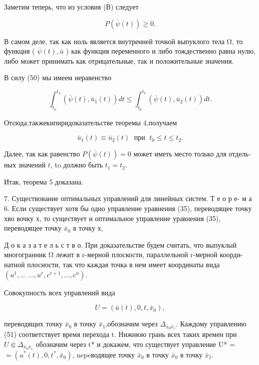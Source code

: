 \documentclass[10pt]{article}
\begin{document}
Заметим теперь, что из условия (В) следует

\[
P\left( {\overline{\psi }\left( t\right) }\right)  \geq  0. \tag{50}
\]

В самом деле, так как ноль является внутренней точкой выпуклого тела Ω, то функция ( \(\overline{\psi }\left( t\right),\bar{u}\) ) как функция переменного и либо тождественно равна нулю, либо может принимать как отрицательные, так и положительные значения.

В силу (50) мы имеем неравенство

\[
{\int }_{{t}_{0}}^{{t}_{2}}\left( {\overline{\psi }\left( t\right),{\bar{u}}_{1}\left( t\right) }\right) {dt} \leq  {\int }_{{t}_{0}}^{{t}_{2}}\left( {\overline{\psi }\left( t\right),{\bar{u}}_{2}\left( t\right) }\right) {dt}.
\]

Отсюда,такжекипиридоказательстве теоремы 4,получаем

\[
{\bar{u}}_{1}\left( t\right)  \equiv  {\bar{u}}_{2}\left( t\right) \;\text{ при }\;{t}_{0} \leq  t \leq  {t}_{2}.
\]

Далее, так как равенство \(P\left( {\overline{\psi }\left( t\right) }\right)  = 0\) может иметь место только для отдель- ных значений \(t\), to должно быть \({t}_{1} = {t}_{2}\).

Итак, теорема 5 доказана.

7. Существование оптимальных управлений для линейных систем. Т е о р е- м а 6. Если существует хотя бы одно управление уравнения (35), переводящее точку хво вочку х, то существует и оптимальное управление уравнения (35), переводящее точку \({\bar{x}}_{0}\) в точку х,

Д о к а з а т е л ь с т в о. При доказательстве будем считать, что выпуклый многогранник Ω лежит в r-мерной плоскости, параллельной r-мерной коорди- натной плосности, так что каждая точка в нем имеет координаты вида \(\left( {{u}^{1},\ldots }\right. \; \left. {\ldots,{u}^{r},{c}^{r + 1},\ldots,{c}^{n}}\right)\).

Совокупность всех управлений вида

\[
U = \left( {\bar{u}\left( t\right),0,t,{\bar{x}}_{0}}\right), \tag{51}
\]

переводящих точку \({\bar{x}}_{0}\) в точку \({\bar{x}}_{1}\),обозначим через \({\Delta }_{{\bar{x}}_{0}{\bar{x}}_{1}}\). Каждому управлению (51) соответствует время перехода t. Нижнюю грань всех таких времен при \(U \Subset  {\Delta }_{{\bar{x}}_{0}{\bar{x}}_{1}}\) обозначим через t* и докажем, что существует управление U* = \(= \left( {{u}^{ * }\left( t\right),0,{t}^{ * },{\bar{x}}_{0}}\right)\), nepeводящее точку \({\bar{x}}_{0}\) в точку \({\bar{x}}_{0}\) в точку \({\bar{x}}_{1}\).
\end{document}
